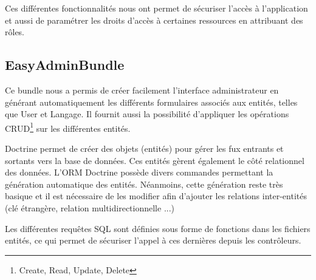 \par Ces différentes fonctionnalités nous ont permet de sécuriser l’accès à l’application et aussi de paramétrer les droits d’accès à certaines ressources en attribuant des rôles.


\subsection{EasyAdminBundle}

\par Ce bundle nous a permis de créer facilement l’interface administrateur en générant automatiquement les différents formulaires associés aux entités, telles que User et Langage. Il fournit aussi la possibilité d’appliquer les opérations CRUD\footnote{Create, Read, Update, Delete} sur les différentes entités.

\par Doctrine permet de créer des objets (entités) pour gérer les fux entrants et sortants vers la base de données. Ces entités gèrent également le côté relationnel des données. L’ORM Doctrine possède divers commandes permettant la génération automatique des entités. Néanmoins, cette génération reste très basique et il est nécessaire de les modifier afin d’ajouter les relations inter-entités (clé étrangère, relation multidirectionnelle ...) 

\par Les différentes requêtes SQL sont définies sous forme de fonctions dans les fichiers entités, ce qui permet de sécuriser l’appel à ces dernières depuis les contrôleurs.